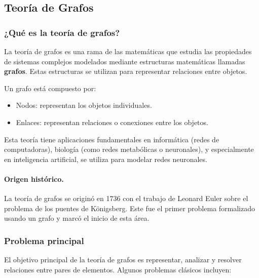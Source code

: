 \subsection{Teoría de Grafos}

\subsubsection{¿Qué es la teoría de grafos?}

La teoría de grafos es una rama de las matemáticas que estudia las propiedades de sistemas complejos modelados mediante estructuras matemáticas llamadas \textbf{grafos}. Estas estructuras se utilizan para representar relaciones entre objetos. 

Un grafo está compuesto por:

\begin{itemize}
    \item Nodos: representan los objetos individuales.
    \item Enlaces: representan relaciones o conexiones entre los objetos.
\end{itemize}

Esta teoría tiene aplicaciones fundamentales en informática (redes de computadoras), biología (como redes metabólicas o neuronales), y especialmente en inteligencia artificial, se utiliza para modelar redes neuronales.

\paragraph{Origen histórico.}  
La teoría de grafos se originó en 1736 con el trabajo de Leonard Euler sobre el problema de los puentes de Königsberg. Este fue el primer problema formalizado usando un grafo y marcó el inicio de esta área.

\subsubsection{Problema principal}

El objetivo principal de la teoría de grafos es representar, analizar y resolver relaciones entre pares de elementos. Algunos problemas clásicos incluyen:


